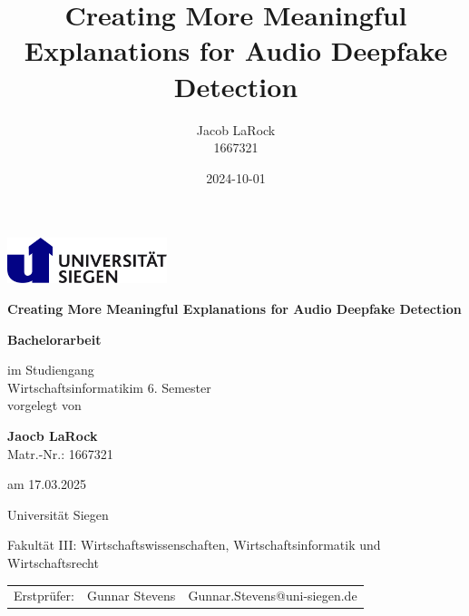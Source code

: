 \documentclass{article}
\title{Creating More Meaningful Explanations for Audio Deepfake Detection}
\date{2024-10-01}
\author{Jacob LaRock\\1667321}
\makeatletter
\def\Institute{Universität Siegen}
\def\KindOfWork{Bachelorarbeit}
\def\Studiengang{Wirtschaftsinformatik}
\def\Fakultaet{Fakultät III: Wirtschaftswissenschaften, Wirtschaftsinformatik und Wirtschaftsrecht}
\def\Title{Creating More Meaningful Explanations for Audio Deepfake Detection}
\def\Subtitle{}
\def\student{Jaocb LaRock}
\def\studentno{1667321}
\def\Date{17.03.2025}
\def\semester{6}
\def\erstpruefer{Gunnar Stevens}
\def\erstprueferMail{Gunnar.Stevens@uni-siegen.de}
\makeatother
\begin{document}
	\begin{titlepage}
        \begin{minipage}{0.9\linewidth}
			\centering
			\includegraphics [width=0.35\textwidth]{images/LogoSiegen}
        \end{minipage}

		\vspace{2cm}

		\centering

		{\Large\bfseries \Title\par}
		{\large\bfseries \Subtitle\par}
		\vspace{2cm}

		{\large \textbf{\KindOfWork}\par}

		\vspace{1.5cm}

		{\normalsize im Studiengang \\
			\Studiengang  im \semester. Semester \\
		}
		\vspace{0.5cm}
		{\normalsize vorgelegt von}
		\vspace{0.5cm}

		{\normalsize \textbf{\student} \\
			Matr.-Nr.: \studentno  \\}
		{am \normalsize \Date\par}

		\vspace{0.5cm}

		{\Institute} \par
		{\Fakultaet}\par

		\vspace{1cm}

    {\begin{table}[h]
			\centering
			\begin{tabular}{lll}
				{Erstprüfer:} & \erstpruefer & \erstprueferMail \\
			\end{tabular}
		\end{table}}     
		\vfill
	\end{titlepage}
    \newpage
\end{document}
